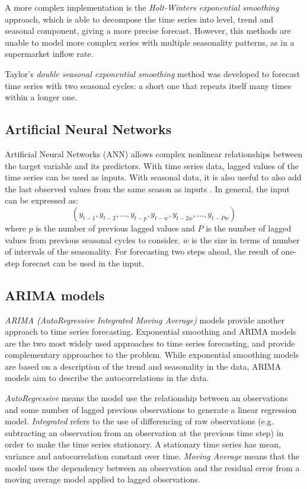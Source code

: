 A more complex implementation is the \emph{Holt-Winters exponential smoothing} approach, which is able to decompose the time series into level, trend and seasonal component, giving a more precise forecast. However, this methods are unable to model more complex series with multiple seasonality patterns, as in a supermarket inflow rate.

Taylor’s \emph{double seasonal exponential smoothing} method \cite{taylor} was developed to forecast time series with two seasonal cycles: a short one that repeats itself many times within a longer one.


\subsection{Artificial Neural Networks}
\label{subsec:artificial_neural_networks}
Artificial Neural Networks (ANN) allows complex nonlinear relationships between the target variable and its predictors. With time series data, lagged values of the time series can be used as inputs. With seasonal data, it is also useful to also add the last observed values from the same season as inputs \cite{hyndman}. In general, the input can be expressed as:
\[ (y_{t-1}, y_{t-2}, ..., y_{t-p}, y_{t-w}, y_{t-2w}, ..., y_{t-Pw}) \]
where \( p \) is the number of previous lagged values and \( P \) is the number of lagged values from previous seasonal cycles to consider. \( w \) is the size in terms of number of intervals of the seasonality.
For forecasting two steps ahead, the result of one-step forecast can be used in the input.

\subsection{ARIMA models}
\label{subsec:arima_models}
\emph{ARIMA (AutoRegressive Integrated Moving Average)} models provide another approach to time series forecasting. Exponential smoothing and ARIMA models are the two most widely used approaches to time series forecasting, and provide complementary approaches to the problem. While exponential smoothing models are based on a description of the trend and seasonality in the data, ARIMA models aim to describe the autocorrelations in the data.\cite{hyndman}

\emph{AutoRegressive} means the model use the relationship between an observations and some number of lagged previous observations to generate a linear regression model. \emph{Integrated} refers to the use of differencing of raw observations (e.g. subtracting an observation from an observation at the previous time step) in order to make the time series stationary. A stationary time series has mean, variance and autocorrelation constant over time. \emph{Moving Average} means that the model uses the dependency between an observation and the residual error from a moving average model applied to lagged observations.

